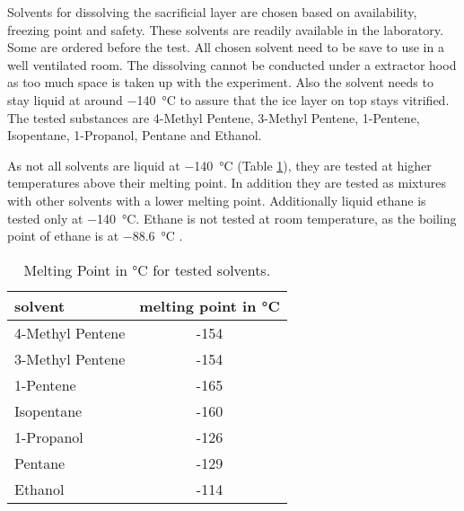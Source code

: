 
Solvents for dissolving the sacrificial layer are chosen based on availability, freezing point and safety. These solvents are readily available in the laboratory. Some are ordered before the test. All chosen solvent need to be save to use in a well ventilated room. The dissolving cannot be conducted under a extractor hood as too much space is taken up with the experiment. Also the solvent needs to stay liquid at around \SI{-140}{\degreeCelsius} to assure that the ice layer on top stays vitrified. The tested substances are 4-Methyl Pentene, 3-Methyl Pentene, 1-Pentene, Isopentane, 1-Propanol, Pentane and Ethanol. 

As not all solvents are liquid at \SI{-140}{\degreeCelsius} (Table \ref{table:SchmelztemperaturLösungsmittel}), they are tested at higher temperatures above their melting point. In addition they are tested as mixtures with other solvents with a lower melting point. Additionally liquid ethane is tested only at  \SI{-140}{\degreeCelsius}. Ethane is not tested at room temperature, as the boiling point of ethane is at \SI{-88.6}{\degreeCelsius} \cite{PubChem.29.08.2023}.


\begin{table}[hbt!]
	\centering
	\begin{tabular}{|l|c|}
		\hline
		solvent & melting point in °C \\
		\hline
		\hline
		4-Methyl Pentene & -154 \\ 
		\hline
		3-Methyl Pentene & -154 \\
		\hline
		1-Pentene & -165 \\
		\hline
		Isopentane & -160 \\
		\hline
		1-Propanol & -126 \\
		\hline
		Pentane & -129 \\
		\hline
		Ethanol & -114 \\
		\hline
	\end{tabular}
	\caption{Melting Point in °C for tested solvents.}
	\label{table:SchmelztemperaturLösungsmittel}
\end{table}

